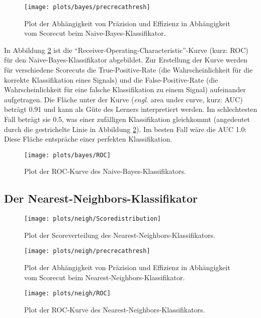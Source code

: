 \begin{figure}
	\centering
	\texttt{[image: plots/bayes/precrecathresh]}
	\caption{Plot der Abhängigkeit von Präzision und Effizienz in Abhängigkeit vom Scorecut beim Naive-Bayes-Klassifikator.}
	\label{fig:NB_PRT}
\end{figure}

In Abbildung \ref{fig:NB_ROC} ist die \enquote{Receiver-Operating-Characteristic}-Kurve (kurz: ROC) für den Naive-Bayes-Klassifikator abgebildet. Zur Erstellung der Kurve werden für verschiedene Scorecuts die True-Positive-Rate (die Wahrscheinlichkeit für die korrekte Klassifikation eines Signals) und die False-Positive-Rate (die Wahrscheinlichkeit für eine falsche Klassifikation zu einem Signal) aufeinander aufgetragen. Die Fläche unter der Kurve (\textit{engl.} area under curve, kurz: AUC) beträgt 0.91 und kann als Güte des Lerners interpretiert werden. Im schlechtesten Fall beträgt sie 0.5, was einer zufälligen Klassifikation gleichkommt (angedeutet durch die gestrichelte Linie in Abbildung \ref{fig:NB_ROC}). Im besten Fall wäre die AUC 1.0: Diese Fläche entspräche einer perfekten Klassifikation. 


\begin{figure}
	\centering
	\texttt{[image: plots/bayes/ROC]}
	\caption{Plot der ROC-Kurve des Naive-Bayes-Klassifikators.}
	\label{fig:NB_ROC}
\end{figure}


\subsection{Der Nearest-Neighbors-Klassifikator}


\begin{figure}
	\centering
	\texttt{[image: plots/neigh/Scoredistribution]}
	\caption{Plot der Scoreverteilung des Nearest-Neighbors-Klassifikators.}
	\label{fig:NN_SD}
\end{figure}

\begin{figure}
	\centering
	\texttt{[image: plots/neigh/precrecathresh]}
	\caption{Plot der Abhängigkeit von Präzision und Effizienz in Abhängigkeit vom Scorecut beim Nearest-Neighbors-Klassifikator.}
	\label{fig:NN_PRT}
\end{figure}


\begin{figure}
	\centering
	\texttt{[image: plots/neigh/ROC]}
	\caption{Plot der ROC-Kurve des Nearest-Neighbors-Klassifikators.}
	\label{fig:NN_ROC}
\end{figure}



